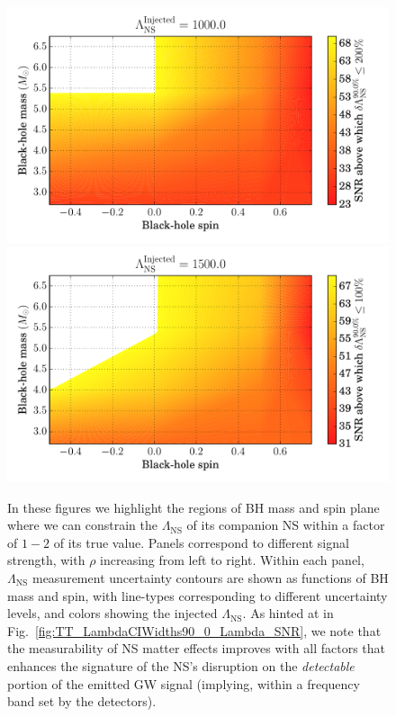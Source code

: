\documentclass[aps,prd,amsmath,floats,floatfix, twocolumn,
superscriptaddress,nofootinbib,showpacs]{revtex4-1}
\newcommand{\lambdans}{\Lambda_\mathrm{NS}}
\begin{document}
\begin{figure}
\centering    
\includegraphics[width=0.9025\columnwidth]{plots/TTSNRThresholdFor200LambdaMeasurement_BHspin_BHmass_Lambda1000_0_CI90_0}
\includegraphics[width=0.9025\columnwidth]{plots/TTSNRThresholdFor100LambdaMeasurement_BHspin_BHmass_Lambda1500_0_CI90_0}
\caption{In these figures we highlight the regions of BH mass and spin plane where we can 
constrain the $\lambdans$ of its companion NS within a factor of $1-2$ of its true value.
Panels correspond to different signal strength, with $\rho$ increasing from left to right.
Within each panel, $\lambdans$ measurement uncertainty contours are shown as functions of BH 
mass and spin, with line-types corresponding to different uncertainty levels, and
colors showing the injected $\lambdans$.
As hinted at in Fig.~\ref{fig:TT_LambdaCIWidths90_0_Lambda_SNR}, we note that the measurability
of NS matter
effects improves with all factors that enhances the signature of the NS's disruption on
the \textit{detectable} portion of the emitted GW signal (implying, within a frequency band
set by the detectors).
}
\label{fig:TT_SNRThresholds_BHspin_BHmass_CI90_0}
\end{figure}
\end{document}
